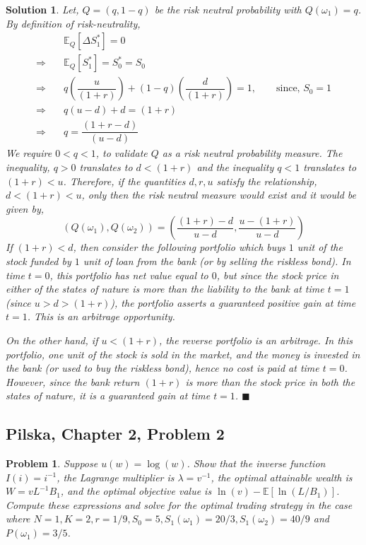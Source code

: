 \documentclass[12pt]{article}
\theoremstyle{problemstyle}
\newtheorem{pbm}{Problem}
\newtheorem*{solution*}{Solution}
\newenvironment{problem}{
\begin{tcolorbox}[colback=green!10!white,colframe=black!75!black, parbox = false]\begin{pbm} }{\end{pbm}\end{tcolorbox} }
\newcommand{\E}{\mathbb{E}}
\begin{document}
\begin{solution*}

Let, $Q = (q, 1-q)$ be the risk neutral probability with $Q(\omega_1) = q$. By definition of risk-neutrality, 
\begin{align*}
    & \E_Q\left[ \Delta S_1^\ast \right] = 0\\
    \Rightarrow \quad & \E_Q\left[ S_1^\ast \right] = S_0^\ast = S_0\\
    \Rightarrow \quad & q \left( \dfrac{u}{(1+r)} \right) + (1 - q)\left( \dfrac{d}{(1+r)} \right) = 1, \qquad \text{since, } S_0 = 1\\
    \Rightarrow \quad & q (u - d) + d = (1 + r)\\
    \Rightarrow \quad & q = \dfrac{(1 + r - d)}{(u - d)}
\end{align*}
We require $0 < q < 1$, to validate $Q$ as a risk neutral probability measure. The inequality, $q > 0$ translates to $d < (1 + r)$ and the inequality $q < 1$ translates to $(1 + r) < u$. Therefore, if the quantities $d, r, u$ satisfy the relationship, $d < (1+r) < u$, only then the risk neutral measure would exist and it would be given by,
$$
\left( Q(\omega_1), Q(\omega_2) \right) = \left( \dfrac{(1+r)-d}{u-d}, \dfrac{u - (1+r)}{u-d} \right)
$$
If $(1+r) < d$, then consider the following portfolio which buys $1$ unit of the stock funded by $1$ unit of loan from the bank (or by selling the riskless bond). In time $t = 0$, this portfolio has net value equal to $0$, but since the stock price in either of the states of nature is more than the liability to the bank at time $t = 1$ (since $u > d > (1+r)$), the portfolio asserts a guaranteed positive gain at time $t = 1$. This is an arbitrage opportunity.

On the other hand, if $u < (1+r)$, the reverse portfolio is an arbitrage. In this portfolio, one unit of the stock is sold in the market, and the money is invested in the bank (or used to buy the riskless bond), hence no cost is paid at time $t = 0$. However, since the bank return $(1+r)$ is more than the stock price in both the states of nature, it is a guaranteed gain at time $t = 1$. \hfill $\blacksquare$

\end{solution*}

\newpage 

\subsection{Pilska, Chapter 2, Problem 2}
\begin{problem}
Suppose $u(w) = \log(w)$. Show that the inverse function $I(i) = i^{-1}$, the Lagrange multiplier is $\lambda = v^{-1}$, the optimal attainable wealth is $W = vL^{-1}B_1$, and the optimal objective value is $\ln(v) - \E\left[ \ln(L/B_1) \right]$. Compute these expressions and solve for the optimal trading strategy in the case where $N = 1, K = 2, r = 1/9, S_0 = 5, S_1(\omega_1) = 20/3, S_1(\omega_2) = 40/9$ and $P(\omega_1) = 3/5$.
\end{problem}
\end{document}
